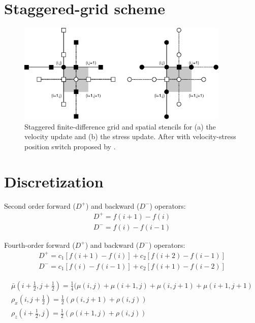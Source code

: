 \documentclass{gnulike}
\begin{document}
\section{Staggered-grid scheme}

\cite{virieux1986psv,levander1988fourth}

\begin{figure}[!ht]
  \centering
  \includegraphics[width=0.9\textwidth]{fig/staggered.eps}
  \caption{Staggered finite-difference grid and spatial stencils for (a) the velocity update and (b) the stress update. After \cite{levander1988fourth} with velocity-stress position switch proposed by \cite{bohlen2006accuracy}.}
  \label{fig:staggered-grid}
\end{figure}

\section{Discretization}

\noindent Second order forward ($D^{+}$) and backward ($D^{-}$) operators:
\begin{eqnarray}
  D^{+}=f(i+1)-f(i) \nonumber \\
  D^{-}=f(i)-f(i-1)
\end{eqnarray}

\noindent Fourth-order forward ($D^{+}$) and backward ($D^{-}$) operators:
\begin{eqnarray}
  D^{+}=c_{1}[f(i+1)-f(i)]+c_{2}[f(i+2)-f(i-1)] \nonumber \\
  D^{-}=c_{1}[f(i)-f(i-1)]+c_{2}[f(i+1)-f(i-2)]
\end{eqnarray}


\begin{eqnarray}
  \bar{\mu}(i+\frac{1}{2}, j+\frac{1}{2})=\frac{1}{4}(\mu(i,j)+\mu(i+1,j)+\mu(i,j+1)+\mu(i+1,j+1) \\
  \rho_{x}(i,j+\frac{1}{2}) = \frac{1}{2}(\rho (i,j+1)+\rho(i,j)) \\
  \rho_{z}(i+\frac{1}{2},j) = \frac{1}{2}(\rho (i+1,j)+\rho(i,j))
\end{eqnarray}
\end{document}
